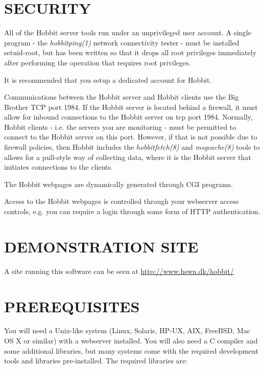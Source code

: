 \section{SECURITY}
 All of the Hobbit server tools run under an unprivileged user
 account. A single program - the \emph{hobbitping(1)} network
 connectivity tester - must be installed setuid-root, but has been
 written so that it drops all root privileges immediately after
 performing the operation that requires root privileges. 

 It is recommended that you setup a dedicated account for Hobbit. 

 Communications between the Hobbit server and Hobbit clients use the
 Big Brother TCP port 1984. If the Hobbit server is located behind a
 firewall, it must allow for inbound connections to the Hobbit server
 on tcp port 1984. Normally, Hobbit clients - i.e. the servers you
 are monitoring - must be permitted to connect to the Hobbit server
 on this port. However, if that is not possible due to firewall
 policies, then Hobbit includes the \emph{hobbitfetch(8)} and
 \emph{msgcache(8)} tools to allows for a pull-style way of
 collecting data, where it is the Hobbit server that initiates
 connections to the clients. 


 The Hobbit webpages are dynamically generated through CGI programs. 


 Access to the Hobbit webpages is controlled through your webserver
 access controls, e.g. you can require a login through some form of
 HTTP authentication. 

 
\section{DEMONSTRATION SITE}
 A site running this software can be seen at \url{http://www.hswn.dk/hobbit/}

 
\section{PREREQUISITES}

 You will need a Unix-like system (Linux, Solaris, HP-UX, AIX,
 FreeBSD, Mac OS X or similar) with a webserver installed. You will
 also need a C compiler and some additional libraries, but many
 systems come with the required development tools and libraries
 pre-installed. The required libraries are: 


